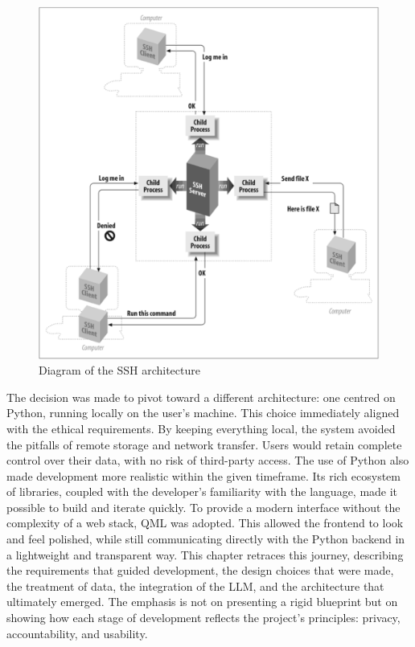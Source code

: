 \documentclass{report}
\begin{document}
\begin{figure}[h!]
  \centering
  \includegraphics[width=\linewidth,height=\textheight,keepaspectratio]{png_files/SSH_Architecture.png}
  \caption{Diagram of the SSH architecture \parencite{barrettSSHSecureShell2005}}
    \label{fig:SSH Architecture}
\end{figure}


The decision was made to pivot toward a different architecture: one centred on Python, running locally on the user's machine. 
This choice immediately aligned with the ethical requirements. 
By keeping everything local, the system avoided the pitfalls of remote storage and network transfer.
Users would retain complete control over their data, with no risk of third-party access. 
The use of Python also made development more realistic within the given timeframe. 
Its rich ecosystem of libraries, coupled with the developer's familiarity with the language, made it possible to build and iterate quickly. 
To provide a modern interface without the complexity of a web stack, QML was adopted. 
This allowed the frontend to look and feel polished, while still communicating directly with the Python backend in a lightweight and transparent way.
This chapter retraces this journey, describing the requirements that guided development, the design choices that were made, the treatment of data, the integration of the LLM, and the architecture that ultimately emerged. 
The emphasis is not on presenting a rigid blueprint but on showing how each stage of development reflects the project's principles: privacy, accountability, and usability.
\end{document}
